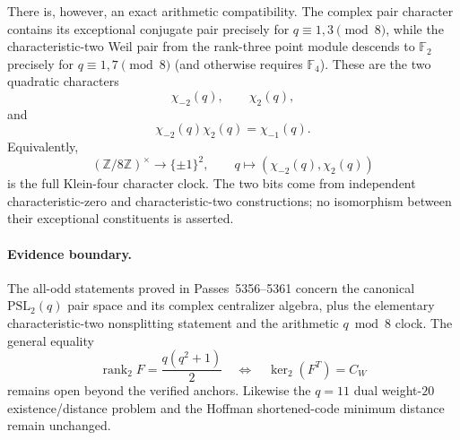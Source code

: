 There is, however, an exact arithmetic compatibility.  The complex pair
character contains its exceptional conjugate pair precisely for
$q\equiv1,3\pmod8$, while the characteristic-two Weil pair from the rank-three
point module descends to $\mathbb F_2$ precisely for
$q\equiv1,7\pmod8$ (and otherwise requires $\mathbb F_4$).  These are the two
quadratic characters
\[
 \chi_{-2}(q),\qquad \chi_2(q),
\]
and
\[
 \chi_{-2}(q)\chi_2(q)=\chi_{-1}(q).
\]
Equivalently,
\[
 \boxed{
 (\mathbb Z/8\mathbb Z)^\times
 \longrightarrow \{\pm1\}^2,
 \qquad
 q\longmapsto(\chi_{-2}(q),\chi_2(q))
 }
\]
is the full Klein-four character clock.  The two bits come from independent
characteristic-zero and characteristic-two constructions; no isomorphism
between their exceptional constituents is asserted.

\paragraph{Evidence boundary.}
The all-odd statements proved in Passes~5356--5361 concern the canonical
$\mathrm{PSL}_2(q)$ pair space and its complex centralizer algebra, plus the elementary
characteristic-two nonsplitting statement and the arithmetic $q\bmod8$ clock.
The general equality
\[
 \operatorname{rank}_{2}F=\frac{q(q^2+1)}2
 \quad\Longleftrightarrow\quad
 \ker_2(F^T)=C_W
\]
remains open beyond the verified anchors.  Likewise the $q=11$ dual
weight-$20$ existence/distance problem and the Hoffman shortened-code minimum
distance remain unchanged.
